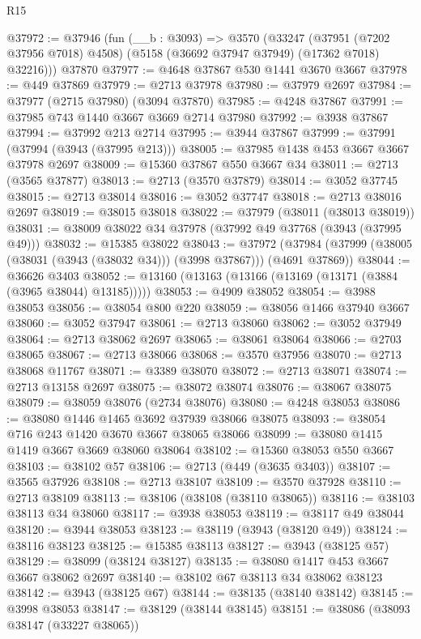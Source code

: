 \begin{lexlean}{R15}
\begin{coremodule}
@37972 := @37946
    (fun (__b : @3093) =>
    @3570
      (@33247
        (@37951 (@7202 @37956 @7018) @4508)
        (@5158 (@36692 @37947 @37949) (@17362 @7018) @32216)))
    @37870
@37977 := @4648 @37867 @530 @1441 @3670 @3667
@37978 := @449 @37869
@37979 := @2713 @37978
@37980 := @37979 @2697
@37984 := @37977 (@2715 @37980) (@3094 @37870)
@37985 := @4248 @37867
@37991 := @37985 @743 @1440 @3667 @3669 @2714 @37980
@37992 := @3938 @37867
@37994 := @37992 @213 @2714
@37995 := @3944 @37867
@37999 := @37991 (@37994 (@3943 (@37995 @213)))
@38005 := @37985 @1438 @453 @3667 @3667 @37978 @2697
@38009 := @15360 @37867 @550 @3667 @34
@38011 := @2713 (@3565 @37877)
@38013 := @2713 (@3570 @37879)
@38014 := @3052 @37745
@38015 := @2713 @38014
@38016 := @3052 @37747
@38018 := @2713 @38016 @2697
@38019 := @38015 @38018
@38022 := @37979 (@38011 (@38013 @38019))
@38031 := @38009 @38022 @34 @37978 (@37992 @49 @37768 (@3943 (@37995 @49)))
@38032 := @15385 @38022
@38043 := @37972
    (@37984 (@37999 (@38005 (@38031 (@3943 (@38032 @34))) (@3998 @37867))) (@4691 @37869))
@38044 := @36626 @3403
@38052 := @13160 (@13163 (@13166 (@13169 (@13171 (@3884 (@3965 @38044) @13185)))))
@38053 := @4909 @38052
@38054 := @3988 @38053
@38056 := @38054 @800 @220
@38059 := @38056 @1466 @37940 @3667
@38060 := @3052 @37947
@38061 := @2713 @38060
@38062 := @3052 @37949
@38064 := @2713 @38062 @2697
@38065 := @38061 @38064
@38066 := @2703 @38065
@38067 := @2713 @38066
@38068 := @3570 @37956
@38070 := @2713 @38068 @11767
@38071 := @3389 @38070
@38072 := @2713 @38071
@38074 := @2713 @13158 @2697
@38075 := @38072 @38074
@38076 := @38067 @38075
@38079 := @38059 @38076 (@2734 @38076)
@38080 := @4248 @38053
@38086 := @38080 @1446 @1465 @3692 @37939 @38066 @38075
@38093 := @38054 @716 @243 @1420 @3670 @3667 @38065 @38066
@38099 := @38080 @1415 @1419 @3667 @3669 @38060 @38064
@38102 := @15360 @38053 @550 @3667
@38103 := @38102 @57
@38106 := @2713 (@449 (@3635 @3403))
@38107 := @3565 @37926
@38108 := @2713 @38107
@38109 := @3570 @37928
@38110 := @2713 @38109
@38113 := @38106 (@38108 (@38110 @38065))
@38116 := @38103 @38113 @34 @38060
@38117 := @3938 @38053
@38119 := @38117 @49 @38044
@38120 := @3944 @38053
@38123 := @38119 (@3943 (@38120 @49))
@38124 := @38116 @38123
@38125 := @15385 @38113
@38127 := @3943 (@38125 @57)
@38129 := @38099 (@38124 @38127)
@38135 := @38080 @1417 @453 @3667 @3667 @38062 @2697
@38140 := @38102 @67 @38113 @34 @38062 @38123
@38142 := @3943 (@38125 @67)
@38144 := @38135 (@38140 @38142)
@38145 := @3998 @38053
@38147 := @38129 (@38144 @38145)
@38151 := @38086 (@38093 @38147 (@33227 @38065))

\end{coremodule}
\end{lexlean}
